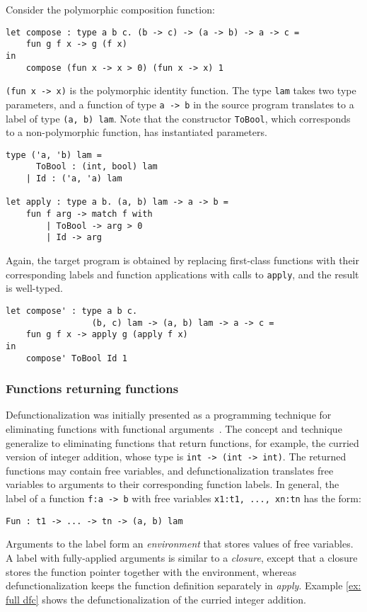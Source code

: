 \begin{exmp}
\label{ex: poly dfc}
Consider the polymorphic composition function:
\begin{lstlisting}
let compose : type a b c. (b -> c) -> (a -> b) -> a -> c =
    fun g f x -> g (f x) 
in
    compose (fun x -> x > 0) (fun x -> x) 1
\end{lstlisting}
\texttt{(fun x -> x)} is the polymorphic identity function. The type \texttt{lam} takes two type parameters, and a function of type \texttt{a -> b} in the source program translates to a label of type \texttt{(a, b) lam}. Note that the constructor \texttt{ToBool}, which corresponds to a non-polymorphic function, has instantiated parameters. 
\begin{lstlisting}
type ('a, 'b) lam = 
      ToBool : (int, bool) lam
    | Id : ('a, 'a) lam

let apply : type a b. (a, b) lam -> a -> b =
    fun f arg -> match f with
        | ToBool -> arg > 0
        | Id -> arg
\end{lstlisting}
Again, the target program is obtained by replacing first-class functions with their corresponding labels and function applications with calls to \texttt{apply}, and the result is well-typed.
\begin{lstlisting}
let compose' : type a b c. 
                 (b, c) lam -> (a, b) lam -> a -> c =
    fun g f x -> apply g (apply f x)
in 
    compose' ToBool Id 1
\end{lstlisting}
	
\end{exmp}

\subsubsection{Functions returning functions}
Defunctionalization was initially presented as a programming technique for eliminating functions with functional arguments~\cite{DBLP:conf/acm/Reynolds72}. The concept and technique generalize to eliminating functions that return functions, for example, the curried version of integer addition, whose type is \texttt{int -> (int -> int)}. The returned functions may contain free variables, and defunctionalization translates free variables to arguments to their corresponding function labels. In general, the label of a function \texttt{f:a -> b} with free variables \texttt{x1:t1, ..., xn:tn} has the form:
\begin{lstlisting}
Fun : t1 -> ... -> tn -> (a, b) lam
\end{lstlisting}
Arguments to the label form an \textit{environment} that stores values of free variables. A label with fully-applied arguments is similar to a \textit{closure}, except that a closure stores the function pointer together with the environment, whereas defunctionalization keeps the function definition separately in \textit{apply}. Example \ref{ex: full dfc} shows the defunctionalization of the curried integer addition.

